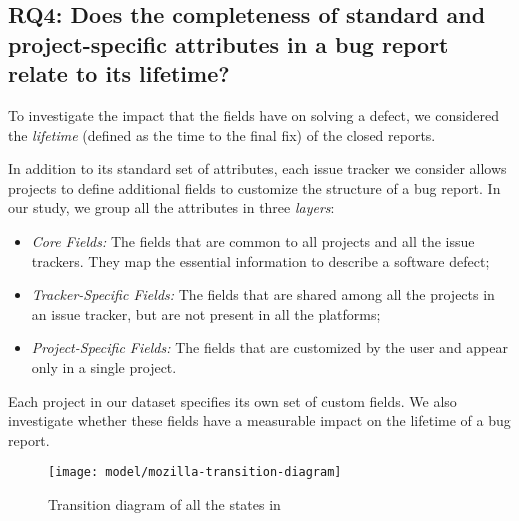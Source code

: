\subsection*{RQ4: Does the completeness of standard and project-specific attributes in a bug report relate to its lifetime?}\label{sec:fields}


To investigate the impact that the fields have on solving a defect, we considered the \emph{lifetime} (defined as the time to the final fix) of the closed reports.

In addition to its standard set of attributes, each issue tracker we consider allows projects to define additional fields to customize the structure of a bug report. In our study, we group all the attributes in three \emph{layers}:

\begin{itemize}[$\circ$]
\item {\it Core Fields:} The fields that are common to all projects and all the issue trackers. They map the essential information to describe a software defect;
\item {\it Tracker-Specific Fields:} The fields that are shared among all the projects in an issue tracker, but are not present in all the platforms;
\item {\it Project-Specific Fields:} The fields that are customized by the user and appear only in a single project.
\end{itemize}

Each project in our dataset specifies its own set of custom fields. We also investigate whether these fields have a measurable impact on the lifetime of a bug report.

\begin{figure}[h!]
\centering
\texttt{[image: model/mozilla-transition-diagram]}
\caption{Transition diagram of all the states in \bzilla}
\label{fig:mozilla_transitions}
\end{figure}


